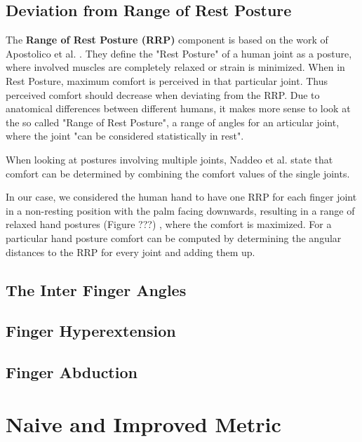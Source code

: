 \subsection{Deviation from Range of Rest Posture}

The \textbf{Range of Rest Posture (RRP)} component is based on the work of Apostolico et al. \cite{apostolico2014postural}. They define the "Rest Posture" of a human joint as a posture, where involved muscles are completely relaxed or strain is minimized. When in Rest Posture, maximum comfort is perceived in that particular joint. Thus perceived comfort should decrease when deviating from the RRP. 
Due to anatomical differences between different humans, it makes more sense to look at the so called "Range of Rest Posture", a range of angles for an articular joint, where the joint "can be considered statistically in rest".

When looking at postures involving multiple joints, Naddeo et al. \cite{naddeo2015proposal} state that comfort can be determined by combining the comfort values of the single joints.

In our case, we considered the human hand to have one RRP for each finger joint in a non-resting position with the palm facing downwards, resulting in a range of relaxed hand postures \colorbox[rgb]{1,0,0}{(Figure ???)}
, where the comfort is maximized. For a particular hand posture comfort can be computed by determining the angular distances to the RRP for every joint and adding them up.

\subsection{The Inter Finger Angles}


\subsection{Finger Hyperextension}


\subsection{Finger Abduction}


\section{Naive and Improved Metric}
